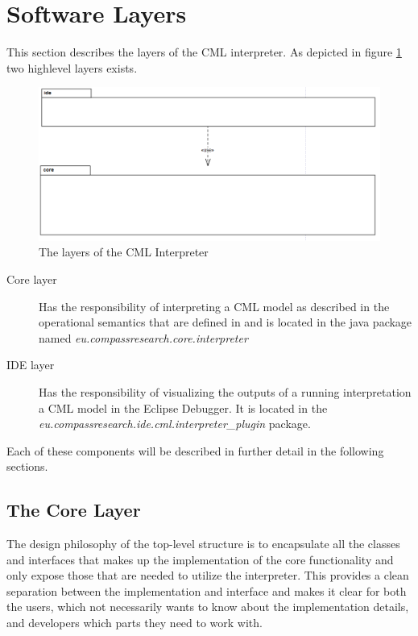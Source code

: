 \documentclass[a4paper, 10pt]{include/compassreport}   %
\begin{document}
\section{Software Layers}
\label{sec:software_layers}
This section describes the layers of the CML
interpreter. As depicted in figure \ref{fig:layers} two highlevel layers exists.

\begin{figure}[ht!]
  \begin{center}
    \includegraphics[width=1\textwidth]{figures/layers}
    \caption{The layers of the CML Interpreter}
    \label{fig:layers}
  \end{center}
\end{figure}

\begin{description}
\item[Core layer] Has the responsibility of interpreting a CML model
  as described in the operational semantics that are defined in
  \cite{D23.4} and is located in the java package named
  \emph{eu.compassresearch.core.interpreter}

\item[IDE layer] Has the responsibility of visualizing the outputs of
  a running interpretation a CML model in the Eclipse Debugger. It is
  located in the \emph{eu.compassresearch.ide.cml.interpreter\_plugin}
  package.
\end{description}

Each of these components will be described in further detail in the
following sections.

\subsection{The Core Layer}

The design philosophy of the top-level structure is to encapsulate all
the classes and interfaces that makes up the implementation of the
core functionality and only expose those that are needed to utilize
the interpreter. This provides a clean separation between the
implementation and interface and makes it clear for both the users,
which not necessarily wants to know about the implementation details,
and developers which parts they need to work with.
\end{document}
